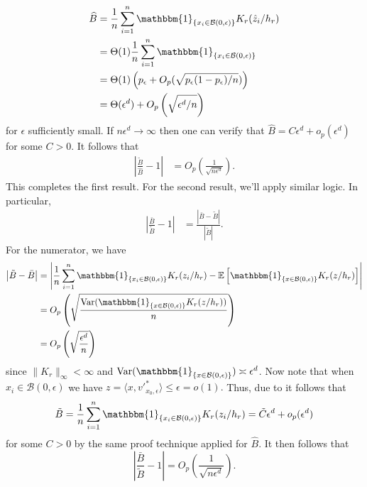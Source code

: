 \documentclass[11pt]{article}
\begin{document}
\begin{align*}
\widehat{B} &= \frac{1}{n}\sum_{i = 1}^n\mathbbm{1}_{\{x_i \in \mathcal{B}(0, \epsilon)\}}K_r(\hat{z}_i/h_r) \\
&= \Theta(1)\frac{1}{n}\sum_{i = 1}^n\mathbbm{1}_{\{x_i \in \mathcal{B}(0, \epsilon)\}} \\
&= \Theta(1)\left(p_{\epsilon} + O_p(\sqrt{p_{\epsilon}(1-p_{\epsilon})/n})\right) \\
&= \Theta(\epsilon^d) + O_p\left(\sqrt{\epsilon^d/n}\right)
\end{align*}
for $\epsilon$ sufficiently small. If $n\epsilon^d \rightarrow \infty$ then one can verify that $\widehat{B} = C\epsilon^d + o_p(\epsilon^d)$ for some $C > 0$. It follows that 
\begin{align*}
    \left|\frac{\tilde{B}}{\widehat{B}} - 1\right| &= O_p\left(\frac{1}{\sqrt{n\epsilon^d}}\right).
\end{align*}
This completes the first result. For the second result, we'll apply similar logic. In particular,
\begin{align*}
    \left|\frac{\bar{B}}{\tilde{B}} - 1\right| &= \frac{\left|\bar{B} - \tilde{B}\right|}{\left|\tilde{B}\right|}.
\end{align*}
For the numerator, we have 
\begin{align*}
    \left|\tilde{B} - \bar{B}\right| &= \left|\frac{1}{n}\sum_{i = 1}^n\mathbbm{1}_{\{x_i \in \mathcal{B}(0, \epsilon)\}}K_r(z_i/h_r) - \mathbb{E}\left[\mathbbm{1}_{\{x \in \mathcal{B}(0, \epsilon)\}}K_r(z/h_r)\right]\right| \\
    &= O_p\left(\sqrt{\frac{\operatorname{Var}(\mathbbm{1}_{\{x \in \mathcal{B}(0, \epsilon)\}}K_r(z/h_r))}{n}}\right) \\
    &= O_p\left(\sqrt{\frac{\epsilon^d}{n}}\right)
\end{align*}
since $\|K_r\|_{\infty} < \infty$ and $\operatorname{Var}(\mathbbm{1}_{\{x \in \mathcal{B}(0, \epsilon)\}}) \asymp \epsilon^d$. Now note that
when $x_i \in \mathcal{B}(0, \epsilon)$ we have $z = \langle x, v'^*_{x_0, \epsilon}\rangle \leq \epsilon = o(1).$ Thus, due to  it follows that 
\[\tilde{B} = \frac{1}{n}\sum_{i = 1}^n\mathbbm{1}_{\{x_i \in \mathcal{B}(0, \epsilon)\}}K_r(z_i/h_r) =  \tilde C\epsilon^d + o_p(\epsilon^d)\]
for some $C > 0$ by the same proof technique applied for $\widehat{B}$. It then follows that 
\begin{equation*}
    \left|\frac{\bar{B}}{\tilde{B}} - 1\right| = O_p\left(\frac{1}{\sqrt{n\epsilon^d}}\right).
\end{equation*}
\end{document}
